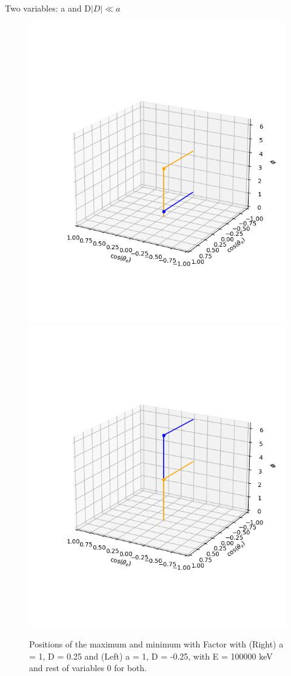 \documentclass{beamer}
\begin{document}
\begin{frame}{Two variables: a and D}{$|D|\ll a$}
	\begin{figure}
		\centering
		\includegraphics[width=0.4\paperwidth]{plots/posa_xsposD_max_min}
		\includegraphics[width=0.4\paperwidth]{plots/posa_xsnegD_max_min}
		\caption{Positions of the maximum and minimum with Factor with (Right) a = 1, D = 0.25 and (Left) a = 1, D = -0.25, with E = 100000 keV and rest of variables 0 for both.}
	\end{figure}
\end{frame}
\end{document}

